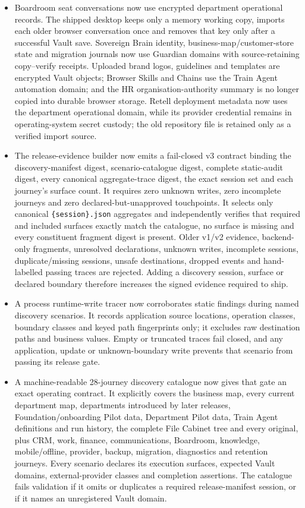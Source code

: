 \documentclass[11pt]{article}
\begin{document}
\begin{itemize}
  \item Boardroom seat conversations now use encrypted department operational records. The shipped desktop keeps only a memory working copy, imports each older browser conversation once and removes that key only after a successful Vault save. Sovereign Brain identity, business-map/customer-store state and migration journals now use Guardian domains with source-retaining copy--verify receipts. Uploaded brand logos, guidelines and templates are encrypted Vault objects; Browser Skills and Chains use the Train Agent automation domain; and the HR organisation-authority summary is no longer copied into durable browser storage. Retell deployment metadata now uses the department operational domain, while its provider credential remains in operating-system secret custody; the old repository file is retained only as a verified import source.
  \item The release-evidence builder now emits a fail-closed v3 contract binding the discovery-manifest digest, scenario-catalogue digest, complete static-audit digest, every canonical aggregate-trace digest, the exact session set and each journey's surface count. It requires zero unknown writes, zero incomplete journeys and zero declared-but-unapproved touchpoints. It selects only canonical \texttt{\{session\}.json} aggregates and independently verifies that required and included surfaces exactly match the catalogue, no surface is missing and every constituent fragment digest is present. Older v1/v2 evidence, backend-only fragments, unresolved declarations, unknown writes, incomplete sessions, duplicate/missing sessions, unsafe destinations, dropped events and hand-labelled passing traces are rejected. Adding a discovery session, surface or declared boundary therefore increases the signed evidence required to ship.
  \item A process runtime-write tracer now corroborates static findings during named discovery scenarios. It records application source locations, operation classes, boundary classes and keyed path fingerprints only; it excludes raw destination paths and business values. Empty or truncated traces fail closed, and any application, update or unknown-boundary write prevents that scenario from passing its release gate.
  \item A machine-readable 28-journey discovery catalogue now gives that gate an exact operating contract. It explicitly covers the business map, every current department map, departments introduced by later releases, Foundation/onboarding Pilot data, Department Pilot data, Train Agent definitions and run history, the complete File Cabinet tree and every original, plus CRM, work, finance, communications, Boardroom, knowledge, mobile/offline, provider, backup, migration, diagnostics and retention journeys. Every scenario declares its execution surfaces, expected Vault domains, external-provider classes and completion assertions. The catalogue fails validation if it omits or duplicates a required release-manifest session, or if it names an unregistered Vault domain.

\end{itemize}
\end{document}
